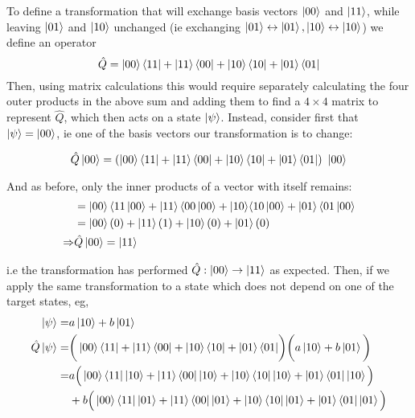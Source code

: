 \begin{example}
    To define a transformation that will exchange basis vectors $\ket{00}$ and $\ket{11}$, 
        while leaving $\ket{01}$ and $\ket{10}$ unchanged (ie exchanging $\ket{01} \leftrightarrow \ket{01}, \ket{10} \leftrightarrow \ket{10} $) 
        we define an operator
    \begin{equation}
        \hat{Q} = \ket{00} \bra{11} + \ket{11} \bra{00} + |10 \rangle \bra{10} + \ket{01} \langle 01| 
    \end{equation}
    Then, using matrix calculations this would require separately calculating the four outer products in the above sum and adding them to find a $4\times4$ matrix to represent $\hat{Q}$, 
        which then acts on a state $\ket{\psi}$. 
    Instead, consider first that $\ket{\psi} = \ket{00}$, ie one of the basis vectors our transformation is to change:

    \begin{equation}
        \hat{Q}\ket{00} = (\ket{00} \bra{11} + \ket{11} \bra{00} + |10 \ra \bra{10} + \ket{01} \la 01|) \ \ket{00} 
    \end{equation}

    And as before, only the inner products of a vector with itself remains:
    \begin{equation}
        \begin{split}
            &= \ket{00} \langle 11 \ket{00} + \ket{11} \langle 00 \ket{00} + |10 \rangle \langle 10 \ket{00} + \ket{01} \langle 01\ket{00} 
            \\ &= \ket{00} (0) + \ket{11} (1) + \ket{10} (0) + \ket{01} (0)
            \\ \Rightarrow & \hat{Q}\ket{00} = \ket{11} 
        \end{split}
    \end{equation}

    i.e the transformation has performed $\hat{Q}: \ket{00} \rightarrow \ket{11}$ as expected. 
    Then, if we apply the same transformation to a state which does not depend on one of the target states, eg,  
    \begin{equation}
        \begin{split}
            \ket{\psi} = & a \ket{10} + b \ket{01} 
            \\ \hat{Q}\ket{\psi} = & \bigg( \ket{00} \bra{11} + \ket{11} \bra{00} + |10 \rangle \bra{10} + \ket{01} \langle 01| \bigg) \bigg( a \ket{10} + b \ket{01} \bigg)
            \\ = &a \Big( \ket{00} \bra{11} \ket{10} + \ket{11} \bra{00}\ket{10} + |10 \rangle \bra{10}\ket{10} + \ket{01} \langle 01| \ket{10} \Big) 
            \\   &+ b \Big(\ket{00} \bra{11}\ket{01} + \ket{11} \langle 00|\ket{01} + |10 \rangle \bra{10}\ket{01} + \ket{01} \langle 01|\ket{01}\Big) 
        \end{split}
    \end{equation}


\end{example}
